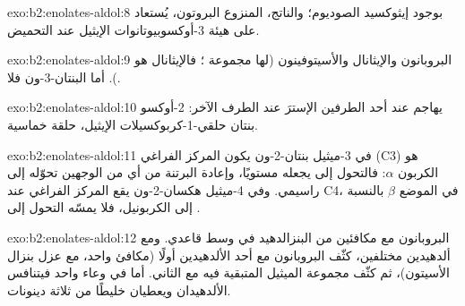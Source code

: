 \begin{solution}{exo:b2:enolates-aldol:8}
 بوجود إيثوكسيد الصوديوم؛ والناتج، المنزوع البروتون،
يُستعاد على هيئة 3-أوكسوبيوتانوات الإيثيل عند التحميض.
\end{solution}

\begin{solution}{exo:b2:enolates-aldol:9}
البروبانون والإيثانال والأسيتوفينون (لها مجموعة ؛ فالإيثانال هو ).
أما البنتان-3-ون فلا.
\end{solution}

\begin{solution}{exo:b2:enolates-aldol:10}
يهاجم  عند أحد الطرفين الإسترَ عند الطرف الآخر: 2-أوكسو بنتان حلقي-1-كربوكسيلات الإيثيل،
حلقة خماسية.
\end{solution}

\begin{solution}{exo:b2:enolates-aldol:11}
في 3-ميثيل بنتان-2-ون يكون المركز الفراغي (C3) هو الكربون $\alpha$: فالتحول إلى  يجعله مستويًا، 
وإعادة البرتنة من أي من الوجهين تحوّله إلى راسيمي. وفي 4-ميثيل هكسان-2-ون يقع المركز الفراغي عند C4،
في الموضع $\beta$ بالنسبة إلى الكربونيل، فلا يمسّه التحول إلى .
\end{solution}

\begin{solution}{exo:b2:enolates-aldol:12}
البروبانون مع مكافئين من البنزالدهيد في وسط قاعدي. ومع ألدهيدين مختلفين، كثّف
البروبانون مع أحد الألدهيدين أولًا (مكافئ واحد، مع عزل بنزال الأسيتون)، ثم كثّف مجموعة
الميثيل المتبقية فيه مع الثاني. أما في وعاء واحد فيتنافس الألدهيدان ويعطيان خليطًا من
ثلاثة دينونات.
\end{solution}

